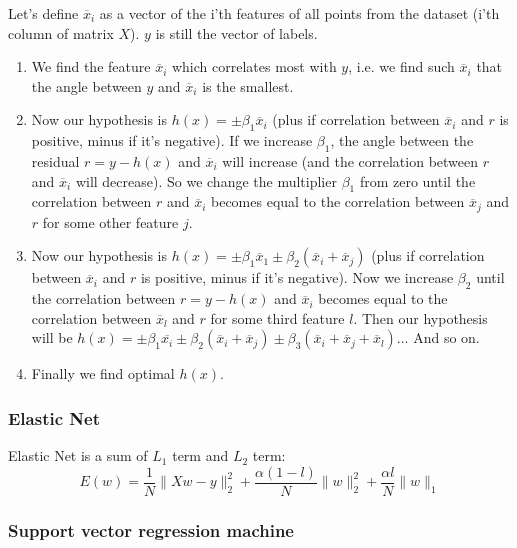 Let's define $\overline{x}_i$ as a vector of the i'th features of all points from the dataset (i'th column of matrix $X$). $y$ is still the vector of labels.
\begin{enumerate}
	\item We find the feature $\overline{x}_i$ which correlates most with $y$, i.e. we find such $\overline{x}_i$ that the angle between $y$ and $\overline{x}_i$ is the smallest.
	\item Now our hypothesis is $h(x)=\pm\beta_1\overline{x}_i$ (plus if correlation between $\overline{x}_i$ and $r$ is positive, minus if it's negative). If we increase $\beta_1$, the angle between the residual $r=y-h(x)$ and $\overline{x}_i$ will increase (and  the correlation between $r$ and $\overline{x}_i$ will decrease). So we change the multiplier $\beta_1$ from zero until the correlation between $r$ and $\overline{x}_i$ becomes equal to the correlation between $\overline{x}_j$ and $r$ for some other feature $j$.
	\item Now our hypothesis is $h(x)=\pm\beta_1\overline{x}_1\pm\beta_2(\overline{x}_i+\overline{x}_j)$ (plus if correlation between $\overline{x}_i$ and $r$ is positive, minus if it's negative). Now we increase $\beta_2$ until the correlation between $r=y-h(x)$ and $\overline{x}_i$ becomes equal to the correlation between $\overline{x}_l$ and $r$ for some third feature $l$. Then our hypothesis will be $h(x)=\pm\beta_1\overline{x_i}\pm\beta_2(\overline{x}_i+\overline{x}_j)\pm\beta_3(\overline{x}_i+\overline{x}_j+\overline{x}_l)$... And so on.
	\item Finally we find optimal $h(x)$.
\end{enumerate}

\subsubsection*{Elastic Net}

Elastic Net is a sum of $L_1$ term and $L_2$ term:
$$E(w)=\frac{1}{N}\|Xw-y\|_2^2+\frac{\alpha(1-l)}{N}\|w\|_2^2+\frac{\alpha l}{N}\|w\|_1$$

\subsubsection*{Support vector regression machine}

